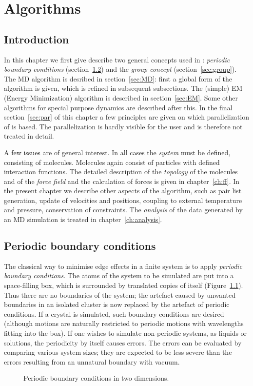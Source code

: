 \chapter{Algorithms}
\label{ch:algorithms}
\section{Introduction}
In this chapter we first give describe two general concepts used in
\gromacs:  {\em periodic boundary conditions} (section~\ref{sec:pbc})
and  the {\em group concept} (section~\ref{sec:group}). The MD algorithm
is desribed in section~\ref{sec:MD}: first a global form of the
algorithm is given, which is refined in subsequent subsections. The
(simple)  EM (Energy Minimization) algorithm is described in
section~\ref{sec:EM}.
Some other algorithms for special purpose dynamics are described after this.
In the final section~\ref{sec:par} of this chapter a few principles
are  given on which parallelization of {\gromacs} is based. The
parallelization  is hardly visible for the user and is therefore not
treated in detail.

A few issues are of general interest. In all cases the {\em system}
must be defined, consisting of molecules. Molecules again consist of
particles  with defined interaction functions. The detailed
description of the {\em topology} of the molecules and of the {\em force
field} and the calculation of forces is given in
chapter~\ref{ch:ff}. In the present chapter we describe
other aspects of the algorithm, such as pair list generation, update of
velocities  and positions, coupling to external temperature and
pressure,  conservation of constraints. The {\em analysis} of the data
generated by an MD simulation is treated in chapter~\ref{ch:analysis}.


\section{Periodic boundary conditions}
\label{sec:pbc}
The classical way to minimise edge effects in a finite system is to
apply {\em periodic boundary conditions}. The atoms of the system to be simulated are put into a space-filling box, which is
surrounded by translated copies of itself (Figure~\ref{fig:pbc}). 
Thus there are no
boundaries of the system; the artefact caused by unwanted
boundaries in an isolated cluster is now replaced by the artefact of
periodic conditions. If a crystal is simulated, such boundary conditions
are desired (although motions are naturally restricted to periodic
motions with wavelengths fitting into the box). If one wishes to
simulate  non-periodic systems, as liquids or solutions, the
periodicity by  itself causes errors. The errors can be evaluated by
comparing various system sizes; they are expected to be less severe than
the errors resulting from an unnatural boundary with vacuum.
\begin {figure}
\centerline{}
\caption {Periodic boundary conditions in two dimensions.}
\label{fig:pbc}
\end {figure}

